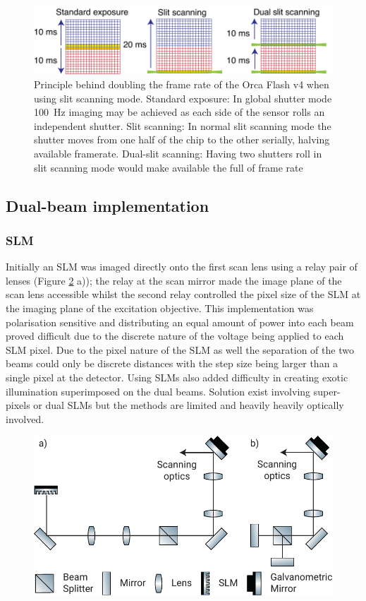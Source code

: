 \begin{figure}
  \centering
  \includegraphics{dual_slit_scanning}
  \caption{
  Principle behind doubling the frame rate of the Orca Flash v4 when using slit scanning mode.
  Standard exposure: In global shutter mode \SI{100}{\hertz} imaging may be achieved as each side of the sensor rolls an independent shutter.
  Slit scanning: In normal slit scanning mode the shutter moves from one half of the chip to the other serially, halving available framerate.
  Dual-slit scanning:
  Having two shutters roll in slit scanning mode would make available the full of frame rate
  }
  \label{fig:dual_slit_scanning}
\end{figure}

\subsection{Dual-beam implementation}
\subsubsection{SLM}
Initially an SLM was imaged directly onto the first scan lens using a relay pair of lenses (Figure \ref{fig:dual_beam_layouts} a)); the relay at the scan mirror made the image plane of the scan lens accessible whilst the second relay controlled the pixel size of the SLM at the imaging plane of the excitation objective.
This implementation was polarisation sensitive and distributing an equal amount of power into each beam proved difficult due to the discrete nature of the voltage being applied to each SLM pixel.
Due to the pixel nature of the SLM as well the separation of the two beams could only be discrete distances with the step size being larger than a single pixel at the detector.
Using SLMs also added difficulty in creating exotic illumination superimposed on the dual beams.
Solution exist involving super-pixels or dual SLMs \cite{tiled_lightsheet_that_guy_from_betzig_lab_wei} but the methods are limited and heavily heavily optically involved.

\begin{figure}
  \centering
  \includegraphics{dual_beam_layouts}
  \caption{}
  \label{fig:dual_beam_layouts}
\end{figure}


